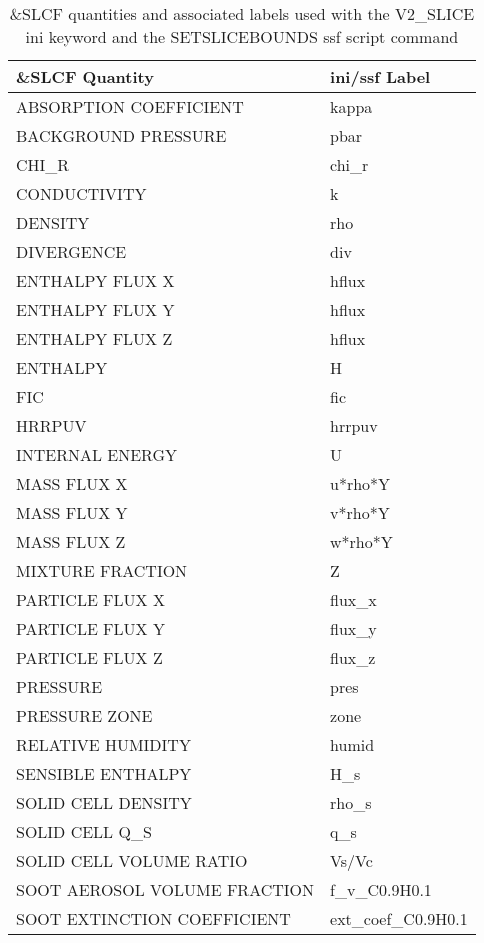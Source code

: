 \begin{table}[bph]
\begin{center}
\caption{\&SLCF quantities and associated labels used with the V2\_SLICE ini keyword and the SETSLICEBOUNDS ssf script command}
\vspace{0.1in}
\begin{tabular}{|l|l|}
\hline
\&SLCF Quantity & ini/ssf Label \\ \hline
 ABSORPTION COEFFICIENT  &   kappa \\ \hline
 BACKGROUND PRESSURE  &   pbar \\ \hline
 CHI\_R  &   chi\_r \\ \hline
 CONDUCTIVITY  &   k \\ \hline
 DENSITY  &   rho \\ \hline
 DIVERGENCE  &   div \\ \hline
 ENTHALPY FLUX X  &   hflux \\ \hline
 ENTHALPY FLUX Y  &   hflux \\ \hline
 ENTHALPY FLUX Z  &   hflux \\ \hline
 ENTHALPY  &   H \\ \hline
 FIC  &   fic \\ \hline
 HRRPUV  &   hrrpuv \\ \hline
 INTERNAL ENERGY  &   U \\ \hline
 MASS FLUX X  &   u*rho*Y \\ \hline
 MASS FLUX Y  &   v*rho*Y \\ \hline
 MASS FLUX Z  &   w*rho*Y \\ \hline
 MIXTURE FRACTION  &   Z \\ \hline
 PARTICLE FLUX X  &   flux\_x \\ \hline
 PARTICLE FLUX Y  &   flux\_y \\ \hline
 PARTICLE FLUX Z  &   flux\_z \\ \hline
 PRESSURE  &   pres \\ \hline
 PRESSURE ZONE  &   zone \\ \hline
 RELATIVE HUMIDITY  &   humid \\ \hline
 SENSIBLE ENTHALPY  &   H\_s \\ \hline
 SOLID CELL DENSITY  &   rho\_s \\ \hline
 SOLID CELL Q\_S  &   q\_s \\ \hline
 SOLID CELL VOLUME RATIO  &   Vs/Vc \\ \hline
 SOOT AEROSOL VOLUME FRACTION  &   f\_v\_C0.9H0.1 \\ \hline
 SOOT EXTINCTION COEFFICIENT  &   ext\_coef\_C0.9H0.1 \\ \hline

\end{tabular}
\end{center}
\end{table}
